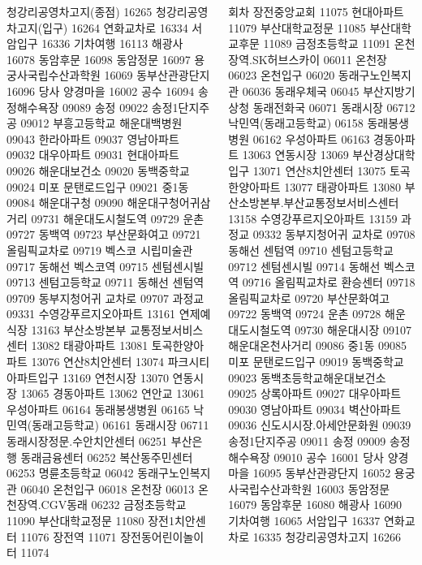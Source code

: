 \documentclass[	14pt, 
							a0paper, 
							landscape, 	%
							margin=0mm, %
							innermargin=4mm,  		%
							blockverticalspace=4mm, %
							colspace=5mm, 
							subcolspace=0mm
							]{tikzposter}
\begin{document}
\begin{columns}
{청강리공영차고지(종점)
16265
청강리공영차고지(입구)
16264
연화교차로
16334
서암입구
16336
기차여행
16113
해광사
16078
동암후문
16098
동암정문
16097
용궁사국립수산과학원
16069
동부산관광단지
16096
당사 양경마을
16002
공수
16094
송정해수욕장
09089
송정
09022
송정1단지주공
09012
부흥고등학교 해운대백병원
09043
한라아파트
09037
영남아파트
09032
대우아파트
09031
현대아파트
09026
해운대보건소
09020
동백중학교
09024
미포 문탠로드입구
09021
중1동
09084
해운대구청
09090
해운대구청어귀삼거리
09731
해운대도시철도역
09729
운촌
09727
동백역
09723
부산문화여고
09721
올림픽교차로
09719
벡스코 시립미술관
09717
동해선 벡스코역
09715
센텀센시빌
09713
센텀고등학교
09711
동해선 센텀역
09709
동부지청어귀 교차로
09707
과정교
09331
수영강푸르지오아파트
13161
연제예식장
13163
부산소방본부 교통정보서비스센터
13082
태광아파트
13081
토곡한양아파트
13076
연산8치안센터
13074
파크시티아파트입구
13169
연천시장
13070
연동시장
13065
경동아파트
13062
연안교
13061
우성아파트
06164
동래봉생병원
06165
낙민역(동래고등학교)
06161
동래시장
06711
동래시장정문.수안치안센터
06251
부산은행 동래금융센터
06252
복산동주민센터
06253
명륜초등학교
06042
동래구노인복지관
06040
온천입구
06018
온천장
06013
온천장역.CGV동래
06232
금정초등학교
11090
부산대학교정문
11080
장전1치안센터
11076
장전역
11071
장전동어린이놀이터
11074

회차
장전중앙교회
11075
현대아파트
11079
부산대학교정문
11085
부산대학교후문
11089
금정초등학교
11091
온천장역.SK허브스카이
06011
온천장
06023
온천입구
06020
동래구노인복지관
06036
동래우체국
06045
부산지방기상청
동래전화국
06071
동래시장
06712
낙민역(동래고등학교)
06158
동래봉생병원
06162
우성아파트
06163
경동아파트
13063
연동시장
13069
부산경상대학입구
13071
연산8치안센터
13075
토곡한양아파트
13077
태광아파트
13080
부산소방본부.부산교통정보서비스센터
13158
수영강푸르지오아파트
13159
과정교
09332
동부지청어귀 교차로
09708
동해선 센텀역
09710
센텀고등학교
09712
센텀센시빌
09714
동해선 벡스코역
09716
올림픽교차로 환승센터
09718
올림픽교차로
09720
부산문화여고
09722
동백역
09724
운촌
09728
해운대도시철도역
09730
해운대시장
09107
해운대온천사거리
09086
중1동
09085
미포 문탠로드입구
09019
동백중학교
09023
동백초등학교해운대보건소
09025
상록아파트
09027
대우아파트
09030
영남아파트
09034
벽산아파트
09036
신도시시장.아세안문화원
09039
송정1단지주공
09011
송정
09009
송정해수욕장
09010
공수
16001
당사 양경마을
16095
동부산관광단지
16052
용궁사국립수산과학원
16003
동암정문
16079
동암후문
16080
해광사
16090
기차여행
16065
서암입구
16337
연화교차로
16335
청강리공영차고지
16266

		}





\end{columns}
\end{document}

